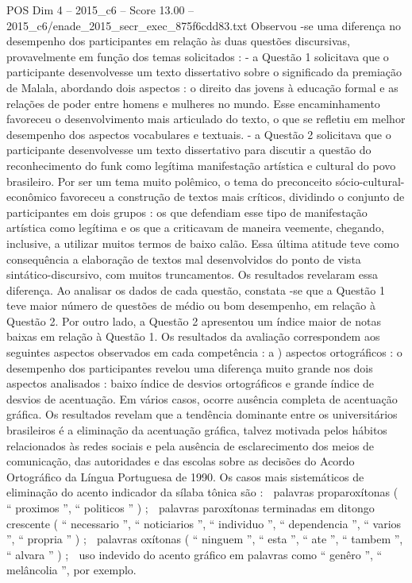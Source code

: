 \begin{textsample}{POS Dim 4 – 2015\_c6 – Score 13.00 – 2015\_c6/enade\_2015\_secr\_exec\_875f6cdd83.txt}
Observou -se uma diferença no desempenho dos participantes em relação às duas questões discursivas, provavelmente em função dos temas solicitados : - a Questão 1 solicitava que o participante desenvolvesse um texto dissertativo sobre o significado da premiação de Malala, abordando dois aspectos : o direito das jovens à educação formal e as relações de poder entre homens e mulheres no mundo.
Esse encaminhamento favoreceu o desenvolvimento mais articulado do texto, o que se refletiu em melhor desempenho dos aspectos vocabulares e textuais. - a Questão 2 solicitava que o participante desenvolvesse um texto dissertativo para discutir a questão do reconhecimento do funk como legítima manifestação artística e cultural do povo brasileiro.
Por ser um tema muito polêmico, o tema do preconceito sócio-cultural-econômico favoreceu a construção de textos mais críticos, dividindo o conjunto de participantes em dois grupos : os que defendiam esse tipo de manifestação artística como legítima e os que a criticavam de maneira veemente, chegando, inclusive, a utilizar muitos termos de baixo calão.
Essa última atitude teve como consequência a elaboração de textos mal desenvolvidos do ponto de vista sintático-discursivo, com muitos truncamentos.
Os resultados revelaram essa diferença.
Ao analisar os dados de cada questão, constata -se que a Questão 1 teve maior número de questões de médio ou bom desempenho, em relação à Questão 2.
Por outro lado, a Questão 2 apresentou um índice maior de notas baixas em relação à Questão 1.
Os resultados da avaliação correspondem aos seguintes aspectos observados em cada competência : a ) aspectos ortográficos : o desempenho dos participantes revelou uma diferença muito grande nos dois aspectos analisados : baixo índice de desvios ortográficos e grande índice de desvios de acentuação.
Em vários casos, ocorre ausência completa de acentuação gráfica.
Os resultados revelam que a tendência dominante entre os universitários brasileiros é a eliminação da acentuação gráfica, talvez motivada pelos hábitos relacionados às redes sociais e pela ausência de esclarecimento dos meios de comunicação, das autoridades e das escolas sobre as decisões do Acordo Ortográfico da Língua Portuguesa de 1990.
Os casos mais sistemáticos de eliminação do acento indicador da sílaba tônica são :  palavras proparoxítonas ( “ proximos ”, “ politicos ” ) ;  palavras paroxítonas terminadas em ditongo crescente ( “ necessario ”, “ noticiarios ”, “ individuo ”, “ dependencia ”, “ varios ”, “ propria ” ) ;  palavras oxítonas ( “ ninguem ”, “ esta ”, “ ate ”, “ tambem ”, “ alvara ” ) ;  uso indevido do acento gráfico em palavras como “ genêro ”, “ melâncolia ”, por exemplo.

\end{textsample}
